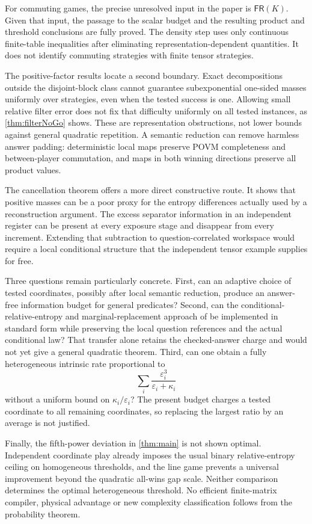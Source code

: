 \documentclass[11pt,reqno]{amsart}
\numberwithin{equation}{section}
\theoremstyle{definition}
\theoremstyle{remark}
\newcommand{\eps}{\varepsilon}
\newcommand{\FR}{\mathsf{FR}}
\begin{document}
For commuting games, the precise unresolved input in the paper is \(\FR(K)\). Given that input, the passage to the scalar budget and the resulting product and threshold conclusions are fully proved. The density step uses only continuous finite-table inequalities after eliminating representation-dependent quantities. It does not identify commuting strategies with finite tensor strategies.

The positive-factor results locate a second boundary. Exact decompositions outside the disjoint-block class cannot guarantee subexponential one-sided masses uniformly over strategies, even when the tested success is one. Allowing small relative filter error does not fix that difficulty uniformly on all tested instances, as \cref{thm:filterNoGo} shows. These are representation obstructions, not lower bounds against general quadratic repetition. A semantic reduction can remove harmless answer padding: deterministic local maps preserve POVM completeness and between-player commutation, and maps in both winning directions preserve all product values.

The cancellation theorem offers a more direct constructive route. It shows that positive masses can be a poor proxy for the entropy differences actually used by a reconstruction argument. The excess separator information in an independent register can be present at every exposure stage and disappear from every increment. Extending that subtraction to question-correlated workspace would require a local conditional structure that the independent tensor example supplies for free.

Three questions remain particularly concrete. First, can an adaptive choice of tested coordinates, possibly after local semantic reduction, produce an answer-free information budget for general predicates? Second, can the conditional-relative-entropy and marginal-replacement approach of \cite{Jain} be implemented in standard form while preserving the local question references and the actual conditional law? That transfer alone retains the checked-answer charge and would not yet give a general quadratic theorem. Third, can one obtain a fully heterogeneous intrinsic rate proportional to
\[
 \sum_i\frac{\eps_i^3}{\eps_i+\kappa_i}
\]
without a uniform bound on \(\kappa_i/\eps_i\)? The present budget charges a tested coordinate to all remaining coordinates, so replacing the largest ratio by an average is not justified.

Finally, the fifth-power deviation in \cref{thm:main} is not shown optimal. Independent coordinate play already imposes the usual binary relative-entropy ceiling on homogeneous thresholds, and the line game prevents a universal improvement beyond the quadratic all-wins gap scale. Neither comparison determines the optimal heterogeneous threshold. No efficient finite-matrix compiler, physical advantage or new complexity classification follows from the probability theorem.
\end{document}
